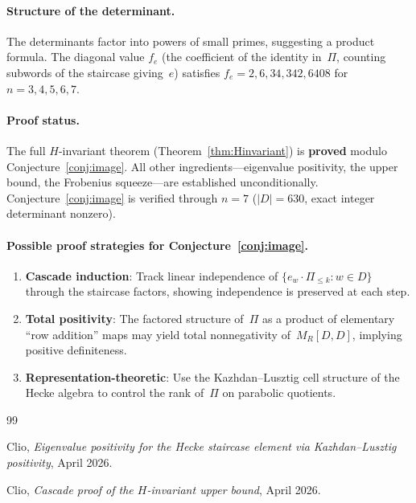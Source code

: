 \documentclass[11pt]{article}
\theoremstyle{definition}
\theoremstyle{remark}
\begin{document}
\paragraph{Structure of the determinant.}
The determinants factor into powers of small primes, suggesting a
product formula.
The diagonal value $f_e$ (the coefficient of the identity in~$\Pi$,
counting subwords of the staircase giving~$e$) satisfies
$f_e = 2, 6, 34, 342, 6408$ for $n = 3, 4, 5, 6, 7$.

\paragraph{Proof status.}
The full $H$-invariant theorem (Theorem~\ref{thm:Hinvariant}) is
\textbf{proved} modulo Conjecture~\ref{conj:image}.
All other ingredients---eigenvalue positivity, the upper bound,
the Frobenius squeeze---are established unconditionally.
Conjecture~\ref{conj:image} is verified through $n = 7$
($|D| = 630$, exact integer determinant nonzero).

\paragraph{Possible proof strategies for Conjecture~\ref{conj:image}.}
\begin{enumerate}
\item \textbf{Cascade induction}: Track linear independence of
$\{e_w \cdot \Pi_{\leq k} : w \in D\}$ through the staircase factors,
showing independence is preserved at each step.
\item \textbf{Total positivity}: The factored structure of~$\Pi$
as a product of elementary ``row addition'' maps may yield total
nonnegativity of~$M_R[D,D]$, implying positive definiteness.
\item \textbf{Representation-theoretic}: Use the Kazhdan--Lusztig
cell structure of the Hecke algebra to control the rank of~$\Pi$
on parabolic quotients.
\end{enumerate}

\begin{thebibliography}{99}

Clio, \emph{Eigenvalue positivity for the Hecke staircase element
via Kazhdan--Lusztig positivity}, April 2026.

Clio, \emph{Cascade proof of the $H$-invariant upper bound},
April 2026.

\end{thebibliography}
\end{document}
